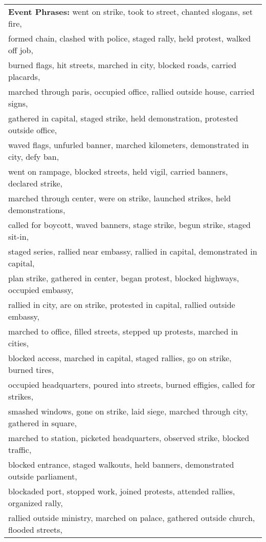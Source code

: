 \begin{table}[htbp]
\small
\centering
\begin{tabular}[center]{|l|} \hline
{\bf Event Phrases:} went on strike, took to street, chanted slogans, set fire,\\
formed chain, clashed with police, staged rally, held protest, walked off job, \\
burned flags, hit streets, marched in city, blocked roads, carried placards, \\
marched through paris, occupied office, rallied outside house, carried signs, \\
gathered in capital, staged strike, held demonstration, protested outside office, \\
waved flags, unfurled banner, marched kilometers, demonstrated in city, defy ban, \\
went on rampage, blocked streets, held vigil, carried banners, declared strike, \\
marched through center, were on strike, launched strikes, held demonstrations, \\
called for boycott, waved banners, stage strike, begun strike, staged sit-in, \\
staged series, rallied near embassy, rallied in capital, demonstrated in capital, \\
plan strike, gathered in center, began protest, blocked highways, occupied embassy, \\
rallied in city, are on strike, protested in capital, rallied outside embassy, \\
marched to office, filled streets, stepped up protests, marched in cities, \\
blocked access, marched in capital, staged rallies, go on strike, burned tires, \\
occupied headquarters, poured into streets, burned effigies, called for strikes, \\
smashed windows, gone on strike, laid siege, marched through city, gathered in square, \\
marched to station, picketed headquarters, observed strike, blocked traffic, \\
blocked entrance, staged walkouts, held banners, demonstrated outside parliament, \\
blockaded port, stopped work, joined protests, attended rallies, organized rally, \\
rallied outside ministry, marched on palace, gathered outside church, flooded streets, \\

\end{tabular}
\end{table}
